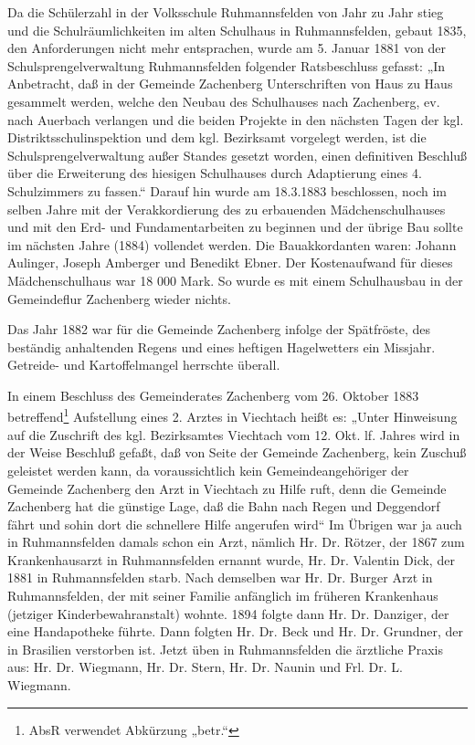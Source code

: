 \documentclass[12pt,a4pager,draft]{book}
\begin{document}
Da die Schülerzahl in der Volksschule Ruhmannsfelden von Jahr zu Jahr stieg und
die Schulräumlichkeiten im alten Schulhaus in Ruhmannsfelden, gebaut 1835, den
Anforderungen nicht mehr entsprachen, wurde am 5. Januar 1881 von der
Schulsprengelverwaltung Ruhmannsfelden folgender Ratsbeschluss gefasst: „In
Anbetracht, daß in der Gemeinde Zachenberg Unterschriften von Haus zu Haus
gesammelt werden, welche den Neubau des Schulhauses nach Zachenberg, ev. nach
Auerbach verlangen und die beiden Projekte in den nächsten Tagen der kgl.
Distriktsschulinspektion und dem kgl. Bezirksamt vorgelegt werden, ist die
Schulsprengelverwaltung außer Standes gesetzt worden, einen definitiven Beschluß
über die Erweiterung des hiesigen Schulhauses durch Adaptierung eines 4.
Schulzimmers zu fassen.“ Darauf hin wurde am 18.3.1883 beschlossen, noch im
selben Jahre mit der Verakkordierung des zu erbauenden Mädchenschulhauses und
mit den Erd- und Fundamentarbeiten zu beginnen und der übrige Bau sollte im
nächsten Jahre (1884) vollendet werden. Die Bauakkordanten waren: Johann
Aulinger, Joseph Amberger und Benedikt Ebner. Der Kostenaufwand für dieses
Mädchenschulhaus war 18 000 Mark. So wurde es mit einem Schulhausbau in der
Gemeindeflur Zachenberg wieder nichts.

Das Jahr 1882 war für die Gemeinde Zachenberg infolge der Spätfröste, des
beständig anhaltenden Regens und eines heftigen Hagelwetters ein Missjahr.
Getreide- und Kartoffelmangel herrschte überall.

In einem Beschluss des Gemeinderates Zachenberg vom 26. Oktober 1883
betreffend\footnote{AbsR verwendet Abkürzung „betr.“} Aufstellung eines 2.
Arztes in Viechtach heißt es: „Unter Hinweisung auf die Zuschrift des kgl.
Bezirksamtes Viechtach vom 12. Okt. lf. Jahres wird in der Weise Beschluß
gefaßt, daß von Seite der Gemeinde Zachenberg, kein Zuschuß geleistet werden
kann, da voraussichtlich kein Gemeindeangehöriger der Gemeinde Zachenberg den
Arzt in Viechtach zu Hilfe ruft, denn die Gemeinde Zachenberg hat die günstige
Lage, daß die Bahn nach Regen und Deggendorf fährt und sohin dort die schnellere
Hilfe angerufen wird“ Im Übrigen war ja auch in Ruhmannsfelden damals schon ein
Arzt, nämlich Hr. Dr. Rötzer, der 1867 zum Krankenhausarzt in Ruhmannsfelden
ernannt wurde, Hr. Dr. Valentin Dick, der 1881 in Ruhmannsfelden starb. Nach
demselben war Hr. Dr. Burger Arzt in Ruhmannsfelden, der mit seiner Familie
anfänglich im früheren Krankenhaus (jetziger Kinderbewahranstalt) wohnte. 1894
folgte dann Hr. Dr. Danziger, der eine Handapotheke führte. Dann folgten Hr. Dr.
Beck und Hr. Dr. Grundner, der in Brasilien verstorben ist. Jetzt üben in
Ruhmannsfelden die ärztliche Praxis aus: Hr. Dr. Wiegmann, Hr. Dr. Stern, Hr.
Dr. Naunin und Frl. Dr. L. Wiegmann.
\end{document}
